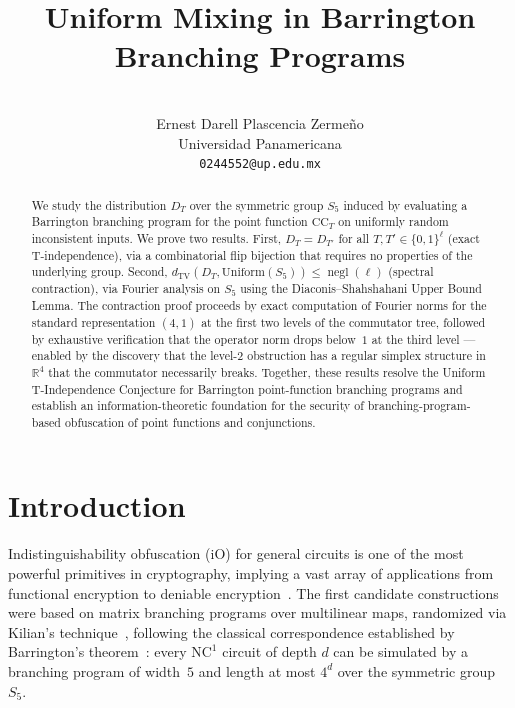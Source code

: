 \documentclass[11pt]{article}
\title{Uniform Mixing in Barrington Branching Programs}
\author{\vspace{3cm}\\Ernest Darell Plascencia Zerme\~no\\
\small Universidad Panamericana\\
\small \texttt{0244552@up.edu.mx}}
\date{}
\DeclareMathOperator{\negl}{negl}
\newcommand{\dtv}{d_{\mathrm{TV}}}
\newcommand{\CC}{\mathrm{CC}}
\begin{document}
\maketitle

\vspace{2cm}
\begin{abstract}
We study the distribution $D_T$ over the symmetric group $S_5$ induced by evaluating
a Barrington branching program for the point function $\CC_T$ on uniformly random
inconsistent inputs. We prove two results. First, $D_T = D_{T'}$ for all
$T, T' \in \{0,1\}^\ell$ (exact T-independence), via a combinatorial flip bijection
that requires no properties of the underlying group. Second,
$\dtv(D_T, \mathrm{Uniform}(S_5)) \leq \negl(\ell)$ (spectral contraction),
via Fourier analysis on $S_5$ using the Diaconis--Shahshahani Upper Bound Lemma.
The contraction proof proceeds by exact computation of Fourier norms for the standard
representation $(4,1)$ at the first two levels of the commutator tree, followed by
exhaustive verification that the operator norm drops below~$1$ at the third level
--- enabled by the discovery that the level-$2$ obstruction has a regular simplex
structure in $\mathbb{R}^4$ that the commutator necessarily breaks. Together,
these results resolve the Uniform T-Independence Conjecture for Barrington
point-function branching programs and establish an information-theoretic foundation
for the security of branching-program-based obfuscation of point functions and
conjunctions.
\end{abstract}

\newpage
\tableofcontents
\newpage

\section{Introduction}
\label{sec:intro}

Indistinguishability obfuscation (iO) for general circuits is one of the most
powerful primitives in cryptography, implying a vast array of applications from
functional encryption to deniable encryption~\cite{GGH+13,SW14}. The first
candidate constructions~\cite{GGH+13} were based on matrix branching programs
over multilinear maps, randomized via Kilian's
technique~\cite{Kil88}, following the classical correspondence established by
Barrington's theorem~\cite{Bar89}: every $\mathrm{NC}^1$ circuit of depth $d$
can be simulated by a branching program of width~$5$ and length at most $4^d$
over the symmetric group $S_5$.
\end{document}
